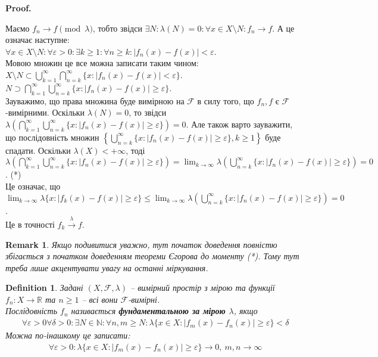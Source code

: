 \documentclass[a4paper, 10pt]{article}
\makeatletter
\theoremstyle{theoremdd}
\newtheorem{definition}[theorem]{Definition}
\newtheorem{remark}[theorem]{Remark}
\newcommand\tomeasure[1]{\overset{{#1}}{\to}}
\renewenvironment{proof}[1][Proof.\\]{\par
\pushQED{\hfill \qed}%
\normalfont \topsep6\p@\@plus6\p@\relax
\trivlist
\item\relax
{\bfseries
#1\@addpunct{.}}\hspace\labelsep\ignorespaces
}{%
\popQED\endtrivlist\@endpefalse
}
\makeatother
\begin{document}
\begin{proof}
Маємо $f_n \to f \pmod \lambda$, тобто звідси $\exists N: \lambda(N) = 0: \forall x \in X \setminus N: f_n \to f$. А це означає наступне:\\
$\forall x \in X \setminus N: \forall \varepsilon > 0: \exists k \geq 1: \forall n \geq k: |f_n(x)-f(x)| < \varepsilon$.\\
Мовою множин це все можна записати таким чином:\\
$X \setminus N \subset \displaystyle\bigcup_{k=1}^\infty \bigcap_{n = k}^\infty \{x : |f_n(x)-f(x)| < \varepsilon\}$.\\
$\displaystyle N \supset \bigcap_{k=1}^\infty \bigcup_{n = k}^\infty \{x : |f_n(x)-f(x)| \geq \varepsilon\}$.\\
Зауважимо, що права множина буде вимірною на $\mathcal{F}$ в силу того, що $f_n,f$ є $\mathcal{F}$-вимірними. Оскільки $\lambda(N) = 0$, то звідси $\displaystyle\lambda\left( \bigcap_{k=1}^\infty \bigcup_{n = k}^\infty \{x : |f_n(x)-f(x)| \geq \varepsilon\} \right) = 0$. Але також варто зауважити, що послідовність множин $\displaystyle\left\{ \bigcup_{n = k}^\infty \{x : |f_n(x)-f(x)| \geq \varepsilon\}, k \geq 1 \right\}$ буде спадати. Оскільки $\lambda(X) < +\infty$, тоді $\displaystyle\lambda\left( \bigcap_{k=1}^\infty \bigcup_{n = k}^\infty \{x : |f_n(x)-f(x)| \geq \varepsilon\} \right) = \lim_{k \to \infty} \lambda\left( \bigcup_{n=k}^\infty \{x: |f_n(x)-f(x)| \geq \varepsilon\} \right) = 0$. (*)\\
Це означає, що $\displaystyle\lim_{k \to \infty}\lambda\{x : |f_k(x) - f(x)| \geq \varepsilon\} \leq \lim_{k \to \infty} \lambda\left( \bigcup_{n=k}^\infty \{x: |f_n(x)-f(x)| \geq \varepsilon\} \right) = 0$.\\
Це в точності $f_k \tomeasure{\lambda} f$.
\end{proof}

\begin{remark}
Якщо подивитися уважно, тут початок доведення повністю збігається з початком доведенням теореми Єгорова до моменту (*). Тому тут треба лише акцентувати увагу на останні міркування.
\end{remark}

\begin{definition}
Задані $(X,\mathcal{F},\lambda)$ -- вимірний простір з мірою та функції $f_n \colon X \to \mathbb{R}$ та $n \geq 1$ -- всі вони $\mathcal{F}$-вимірні.\\
Послідовність $f_n$ називається \textbf{фундаментальною за мірою $\lambda$}, якщо
\begin{align*}
\forall \varepsilon > 0 \forall \delta > 0: \exists N \in \mathbb{N}: \forall n,m \geq N: \lambda \{ x \in X: |f_m(x) - f_n(x)| \geq \varepsilon\} < \delta
\end{align*}
Можна по-інашкому це записати:
\begin{align*}
\forall \varepsilon > 0: \lambda\{ x \in X: |f_m(x)-f_n(x)| \geq \varepsilon \} \to 0,\ m,n \to \infty
\end{align*}
\end{definition}
\end{document}
